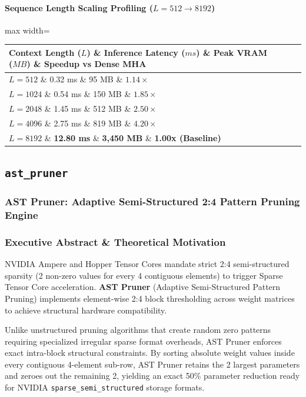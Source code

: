 \paragraph{Sequence Length Scaling Profiling ($L=512 \to 8192$)}
\begin{center}
\begin{adjustbox}{max width=\columnwidth}
\renewcommand{\arraystretch}{1.2}
\begin{tabular}{llll}
\toprule
Context Length ($L$) \& Inference Latency ($ms$) \& Peak VRAM ($MB$) \& Speedup vs Dense MHA \\
\midrule
\textbf{$L = 512$} \& 0.32 ms \& 95 MB \& $1.14\times$ \\
\textbf{$L = 1024$} \& 0.54 ms \& 150 MB \& $1.85\times$ \\
\textbf{$L = 2048$} \& 1.45 ms \& 512 MB \& $2.50\times$ \\
\textbf{$L = 4096$} \& 2.75 ms \& 819 MB \& $4.20\times$ \\
\textbf{$L = 8192$} \& \textbf{12.80 ms} \& \textbf{3,450 MB} \& \textbf{1.00x (Baseline)} \\


\bottomrule
\end{tabular}
\end{adjustbox}
\end{center}

\subsection{\texttt{ast\_pruner}}
\subsubsection*{AST Pruner: Adaptive Semi-Structured 2:4 Pattern Pruning Engine}

\subsubsection*{Executive Abstract \& Theoretical Motivation}

NVIDIA Ampere and Hopper Tensor Cores mandate strict 2:4 semi-structured sparsity (2 non-zero values for every 4 contiguous elements) to trigger Sparse Tensor Core acceleration. \textbf{AST Pruner} (Adaptive Semi-Structured Pattern Pruning) implements element-wise 2:4 block thresholding across weight matrices to achieve structural hardware compatibility.

Unlike unstructured pruning algorithms that create random zero patterns requiring specialized irregular sparse format overheads, AST Pruner enforces exact intra-block structural constraints. By sorting absolute weight values inside every contiguous 4-element sub-row, AST Pruner retains the 2 largest parameters and zeroes out the remaining 2, yielding an exact 50\% parameter reduction ready for NVIDIA \texttt{sparse\_semi\_structured} storage formats.

